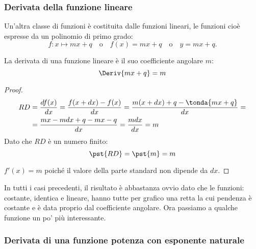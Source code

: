 \subsubsection{Derivata della funzione lineare}
\label{subsec:differenziazione_derivataflineare}

Un'altra classe di funzioni è costituita dalle funzioni lineari, 
le funzioni cioè espresse da un polinomio di primo grado:
\[f: x \mapsto mx +q \quad \text{o} \quad   f(x)=mx +q \quad \text{o} \quad 
  y = mx +q.\]
\begin{teorema}
La derivata di una funzione lineare è il suo coefficiente angolare \(m\):
\[\Deriv{mx+q} = m\]
\end{teorema}
\begin{proof}
\begin{align*}
RD &=\dfrac{df(x)}{dx} =\dfrac{f(x+dx)-f(x)}{dx}=
     \dfrac{m(x+dx)+q-\tonda{mx+q}}{dx}=\\
   &=\dfrac{mx-mdx+q-mx-q}{dx}=
     \dfrac{mdx}{dx}=m
\end{align*}
Dato che \(RD\) è un numero finito:
\[\pst{RD}= \pst{m}=m\]

\vspace{-1em} \hspace{15mm} 
\(f'(x) = m\) poiché il valore della parte standard non dipende da \(dx\).
\end{proof}

In tutti i casi precedenti, il risultato è abbastanza ovvio dato che 
le funzioni: costante, identica e lineare, hanno tutte per grafico una retta 
la cui pendenza è costante e è data proprio dal coefficiente angolare.
Ora passiamo a qualche funzione un po' più interessante.


\subsubsection{Derivata di una funzione potenza con esponente naturale}
\label{subsubsec:derivata_f_potenza_N}

